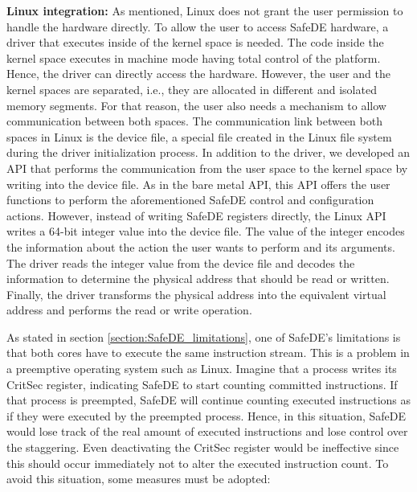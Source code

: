 \textbf{Linux integration:} As mentioned, Linux does not grant the user permission to handle the hardware directly. To allow the user to access SafeDE hardware, a driver that executes inside of the kernel space is needed. The code inside the kernel space executes in machine mode having total control of the platform. Hence, the driver can directly access the hardware. However, the user and the kernel spaces are separated, i.e., they are allocated in different and isolated memory segments. For that reason, the user also needs a mechanism to allow communication between both spaces. The communication link between both spaces in Linux is the device file, a special file created in the Linux file system during the driver initialization process. In addition to the driver, we developed an API that performs the communication from the user space to the kernel space by writing into the device file. As in the bare metal API, this API offers the user functions to perform the aforementioned SafeDE control and configuration actions. However, instead of writing SafeDE registers directly, the Linux API writes a 64-bit integer value into the device file. The value of the integer encodes the information about the action the user wants to perform and its arguments. The driver reads the integer value from the device file and decodes the information to determine the physical address that should be read or written. Finally, the driver transforms the physical address into the equivalent virtual address and performs the read or write operation.

As stated in section \ref{section:SafeDE_limitations}, one of SafeDE's limitations is that both cores have to execute the same instruction stream. This is a problem in a preemptive operating system such as Linux. Imagine that a process writes its CritSec register, indicating SafeDE to start counting committed instructions. If that process is preempted, SafeDE will continue counting executed instructions as if they were executed by the preempted process. Hence, in this situation, SafeDE would lose track of the real amount of executed instructions and lose control over the staggering. Even deactivating the CritSec register would be ineffective since this should occur immediately not to alter the executed instruction count. To avoid this situation, some measures must be adopted:

